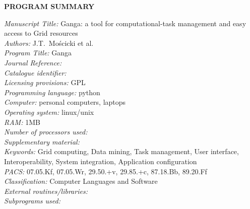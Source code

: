 \documentclass{elsart}
\def\grid {Grid\xspace}
\newcommand{\CPCProgramSummary}[1]{{\bf PROGRAM SUMMARY} %
\begin{small} \noindent #1 \end{small} \newpage}
\begin{document}
\CPCProgramSummary{




{\em Manuscript Title:} Ganga: a tool for computational-task management and easy access to \grid resources\\
{\em Authors:} J.T.~Mo{\'s}cicki et al.                                                \\
{\em Program Title:} Ganga                                          \\
{\em Journal Reference:}                                      \\
{\em Catalogue identifier:}                                   \\
{\em Licensing provisions:} GPL                                   \\
{\em Programming language:} python                                   \\
{\em Computer:} personal computers, laptops                                               \\
{\em Operating system:} linux/unix                                       \\
{\em RAM:} 1MB \\
{\em Number of processors used:}                              \\
{\em Supplementary material:}                                 \\
{\em Keywords:}  Grid computing, Data mining, Task management, 
User interface, Interoperability, System integration, 
Application configuration  \\
{\em PACS:} 07.05.Kf, 07.05.Wr, 29.50.+v, 
29.85.+c, 87.18.Bb, 89.20.Ff \\
{\em Classification:}  Computer Languages and Software                                       \\
{\em External routines/libraries:}                                      \\
{\em Subprograms used:}                                       \\

}
\end{document}
